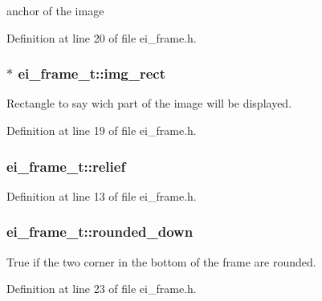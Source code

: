 anchor of the image 



Definition at line 20 of file ei\+\_\+frame.\+h.

\hypertarget{structei__frame__t_a6758a232474fa8b8469ecbc92c699f15}{
\subsubsection[{img\+\_\+rect}]{$\ast$ ei\+\_\+frame\+\_\+t\+::img\+\_\+rect}}\label{structei__frame__t_a6758a232474fa8b8469ecbc92c699f15}


Rectangle to say wich part of the image will be displayed. 



Definition at line 19 of file ei\+\_\+frame.\+h.

\hypertarget{structei__frame__t_a4d0e33d09e4119629f4fa13107b4a9f3}{
\subsubsection[{relief}]{ ei\+\_\+frame\+\_\+t\+::relief}}\label{structei__frame__t_a4d0e33d09e4119629f4fa13107b4a9f3}


Definition at line 13 of file ei\+\_\+frame.\+h.

\hypertarget{structei__frame__t_a38fd04cba482eb2db2705afd10f2060f}{
\subsubsection[{rounded\+\_\+down}]{ ei\+\_\+frame\+\_\+t\+::rounded\+\_\+down}}\label{structei__frame__t_a38fd04cba482eb2db2705afd10f2060f}


True if the two corner in the bottom of the frame are rounded. 



Definition at line 23 of file ei\+\_\+frame.\+h.

